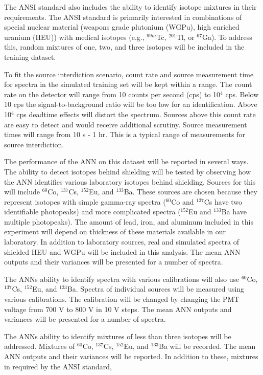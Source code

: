 \documentclass[tocnosub,noragright,centerchapter,12pt,fullpage]{uiucecethesis09}
\begin{document}
The ANSI standard also includes the ability to identify isotope mixtures in their requirements. The ANSI standard is primarily interested in combinations of special nuclear material (weapons grade plutonium (WGPu), high enriched uranium (HEU)) with medical isotopes (e.g., $^{99m}$Tc, $^{201}$Tl, or $^{67}$Ga). To address this, random mixtures of one, two, and three isotopes will be included in the training dataset.

To fit the source interdiction scenario, count rate and source measurement time for spectra in the simulated training set will be kept within a range. The count rate on the detector will range from 10 counts per second (cps) to 10$^{4}$ cps. Below 10 cps the signal-to-background ratio will be too low for an identification. Above 10$^{4}$ cps deadtime effects will distort the spectrum. Sources above this count rate are easy to detect and would receive additional scrutiny. Source measurement times will range from 10 s - 1 hr. This is a typical range of measurements for source interdiction. 

The performance of the ANN on this dataset will be reported in several ways. The ability to detect isotopes behind shielding will be tested by observing how the ANN identifies various laboratory isotopes behind shielding. Sources for this will include $^{60}$Co, $^{137}$Cs, $^{152}$Eu, and $^{133}$Ba. These sources are chosen because they represent isotopes with simple gamma-ray spectra ($^{60}$Co and $^{137}$Cs have two identifiable photopeaks) and more complicated spectra ($^{152}$Eu and $^{133}$Ba have multiple photopeaks). The amount of lead, iron, and aluminum included in this experiment will depend on thickness of these materials available in our laboratory. In addition to laboratory sources, real and simulated spectra of shielded HEU and WGPu will be included in this analysis. The mean ANN outputs and their variances will be presented for a number of spectra. 

The ANNs ability to identify spectra with various calibrations will also use $^{60}$Co, $^{137}$Cs, $^{152}$Eu, and $^{133}$Ba. Spectra of individual sources will be measured using various calibrations. The calibration will be changed by changing the PMT voltage from 700 V to 800 V in 10 V steps. The mean ANN outputs and variances will be presented for a number of spectra. 

The ANNs ability to identify mixtures of less than three isotopes will be addressed. Mixtures of $^{60}$Co, $^{137}$Cs, $^{152}$Eu, and $^{133}$Ba will be recorded. The mean ANN outputs and their variances will be reported. In addition to these, mixtures in required by the ANSI standard, 
\end{document}
